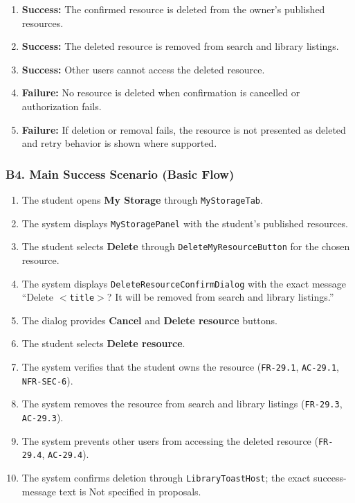 \documentclass[12pt]{article}
\begin{document}
\begin{enumerate}
\item \textbf{Success:} The confirmed resource is deleted from the owner's published resources.
\item \textbf{Success:} The deleted resource is removed from search and library listings.
\item \textbf{Success:} Other users cannot access the deleted resource.
\item \textbf{Failure:} No resource is deleted when confirmation is cancelled or authorization fails.
\item \textbf{Failure:} If deletion or removal fails, the resource is not presented as deleted and retry behavior is shown where supported.
\end{enumerate}
\par\medskip

\hypertarget{sec:b4-main-success-scenario-basic-flow}{}
\subsubsection*{B4. Main Success Scenario (Basic Flow)}
\par\medskip

\begin{enumerate}
\item The student opens \textbf{My Storage} through \texttt{MyStorageTab}.
\item The system displays \texttt{MyStoragePanel} with the student's published resources.
\item The student selects \textbf{Delete} through \texttt{DeleteMyResourceButton} for the chosen resource.
\item The system displays \texttt{DeleteResourceConfirmDialog} with the exact message “Delete \texttt{$<$title$>$}? It will be removed from search and library listings.”
\item The dialog provides \textbf{Cancel} and \textbf{Delete resource} buttons.
\item The student selects \textbf{Delete resource}.
\item The system verifies that the student owns the resource (\texttt{FR-29.1}, \texttt{AC-29.1}, \texttt{NFR-SEC-6}).
\item The system removes the resource from search and library listings (\texttt{FR-29.3}, \texttt{AC-29.3}).
\item The system prevents other users from accessing the deleted resource (\texttt{FR-29.4}, \texttt{AC-29.4}).
\item The system confirms deletion through \texttt{LibraryToastHost}; the exact success-message text is Not specified in proposals.
\end{enumerate}
\par\medskip
\end{document}
